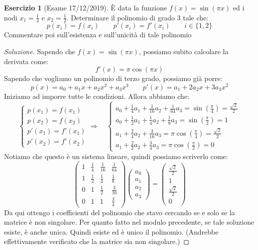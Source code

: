 \documentclass[11pt,a4paper,twoside]{article}
\theoremstyle{definition}
\newtheorem*{ese}{Esercizio}
\newenvironment{sol}
	{\renewcommand\qedsymbol{$\blacksquare$}\begin{proof}[Soluzione]}
	{\end{proof}}
\begin{document}
\begin{ese}[Esame 17/12/2019]
	È data la funzione $f(x) = \sin(\pi x)$ ed i nodi $x_1 = \frac 14$ e $x_2 = \frac 12$. Determinare il polinomio di grado $3$ tale che:
	\[ p(x_i) = f(x_i)\qquad p'(x_i) = f'(x_i)\qquad i \in \{1,2\} \]
	Commentare poi sull'esistenza e sull'unicità di tale polinomio
\end{ese}
\begin{sol}
	Sapendo che $f(x) = \sin(\pi x)$, possiamo subito calcolare la derivata come:
	\[ f'(x) = \pi \cos(\pi x) \]
	Sapendo che vogliamo un polinomio di terzo grado, possiamo già porre:
	\[ p(x) = a_0 + a_1x + a_2x^2 + a_3x^3 \qquad p'(x) = a_1 + 2a_2x + 3a_3x^2 \]
	Iniziamo ad imporre tutte le condizioni. Allora abbiamo che:
	\[
		\begin{cases}
			p(x_1) = f(x_1)\\
			p(x_2) = f(x_2)\\
			p'(x_1) = f'(x_1)\\
			p'(x_2) = f'(x_2)
		\end{cases} \Rightarrow \quad \begin{cases}
			a_0 + \frac 14 a_1 + \frac 1{16} a_2 + \frac 1{64} a_3 = \sin(\frac \pi 4) = \frac{\sqrt 2}2\\
			a_0 + \frac 12 a_1 + \frac 14 a_2 + \frac 18 a_3 = \sin(\frac \pi 2) = 1\\
			a_1 + \frac 24 a_2 + \frac 3{16} a_3 = \pi \cos (\frac \pi 4) = \frac{\sqrt 2}2\\
			a_1 + \frac 22 a_2 + \frac 34 a_3 = \pi \cos(\frac \pi 2) = 0
		\end{cases}
	\]
	Notiamo che questo è un sistema lineare, quindi possiamo scriverlo come:
	\[
		\begin{pmatrix}
			1 & \frac 14 & \frac 1{16} & \frac{1}{64}\\
			1 & \frac 12 & \frac 14 & \frac 18\\
			0 & 1 & \frac 12 & \frac 3{16}\\
			0 & 1 & 1 & \frac 34
		\end{pmatrix}
		\begin{pmatrix}
			a_0\\ a_1\\ a_2\\ a_3
		\end{pmatrix} =
		\begin{pmatrix}
			\frac{\sqrt 2}2\\ 1\\ \frac{\sqrt 2}2\\ 0
		\end{pmatrix}
	\]
	Da qui ottengo i coefficienti del polinomio che stavo cercando se e solo se la matrice è non singolare. Per quanto fatto nel modulo precedente, se tale soluzione esiste, è anche unica. Quindi esiste ed è unico il polinomio. (Andrebbe effettivamente verificato che la matrice sia non singolare.)
\end{sol}
\end{document}
